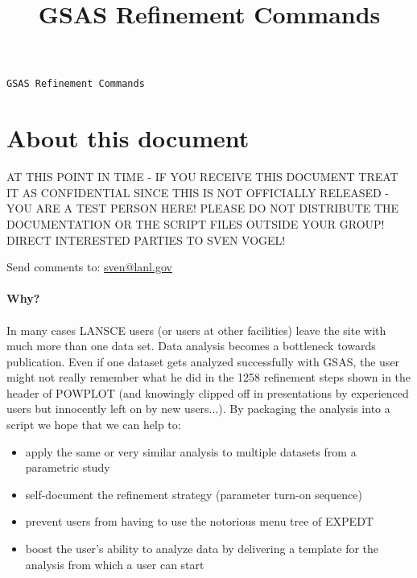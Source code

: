 \documentclass{article}
\title{GSAS Refinement Commands}
\begin{document}
\begin{center}



\verb=GSAS Refinement Commands=
\end{center}

\tableofcontents

\pagebreak


\setcounter{page}{1}

\section{About this document}
\begin{center}
AT THIS POINT IN TIME - IF YOU RECEIVE THIS DOCUMENT TREAT IT AS CONFIDENTIAL SINCE THIS IS NOT OFFICIALLY RELEASED - YOU ARE A TEST PERSON HERE! PLEASE DO NOT DISTRIBUTE THE DOCUMENTATION OR THE SCRIPT FILES OUTSIDE YOUR GROUP!  DIRECT INTERESTED PARTIES TO SVEN VOGEL!\\
\end{center}
Send comments to: \href{mailto:sven@lanl.gov}{sven@lanl.gov} \\ \\
\textbf{\large{Why?}} \\ \\
In many cases LANSCE users (or users at other facilities) leave the site with much more than one data set. Data analysis becomes a bottleneck towards publication. Even if one dataset gets analyzed successfully with GSAS, the user might not really remember what he did in the 1258 refinement steps shown in the header of POWPLOT (and knowingly clipped off in presentations by experienced users but innocently left on by new users...). By packaging the analysis into a script we hope that we can help to:
\begin{itemize}
	\item apply the same or very similar analysis to multiple datasets from a parametric study
  \item self-document the refinement strategy (parameter turn-on sequence)
	\item prevent users from having to use the notorious menu tree of EXPEDT
	\item boost the user's ability to analyze data by delivering a template for the analysis from which a user can start

\end{itemize}
\end{document}
